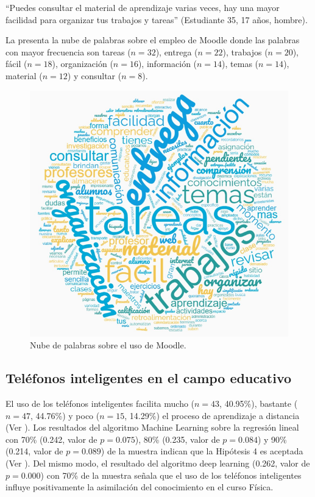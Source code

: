 \documentclass[spanish]{textolivre}
\begin{document}
“Puedes consultar el material de aprendizaje varias veces, hay una mayor facilidad para organizar tus trabajos y tareas” (Estudiante 35, 17 años, hombre).

La  presenta la nube de palabras sobre el empleo de Moodle donde las palabras con mayor frecuencia son tareas ($n = 32$), entrega ($n = 22$), trabajos ($n = 20$), fácil ($n = 18$), organización ($n = 16$), información ($n = 14$), temas ($n = 14$), material ($n = 12$) y consultar ($n = 8$).

\begin{figure}[htbp]
\centering
\begin{minipage}{.85\textwidth}
 \includegraphics[width=\textwidth]{Image8.png}
 \caption{Nube de palabras sobre el uso de Moodle.}
 \label{fig08}
\end{minipage}
\end{figure}

\subsection{Teléfonos inteligentes en el campo educativo}

El uso de los teléfonos inteligentes facilita mucho ($n = 43$, 40.95\%), bastante ($n = 47$, 44.76\%) y poco ($n = 15$, 14.29\%) el proceso de aprendizaje a distancia (Ver ). Los resultados del algoritmo Machine Learning sobre la regresión lineal con 70\% (0.242, valor de $p = 0.075$), 80\% (0.235, valor de $p = 0.084$) y 90\% (0.214, valor de $p = 0.089$) de la muestra indican que la Hipótesis 4 es aceptada (Ver ). Del mismo modo, el resultado del algoritmo deep learning (0.262, valor de $p = 0.000$) con 70\% de la muestra señala que el uso de los teléfonos inteligentes influye positivamente la asimilación del conocimiento en el curso Física.
\end{document}
